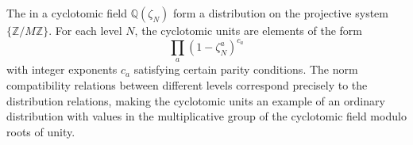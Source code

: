The  in a cyclotomic field $\mathbb{Q}(\zeta_N)$ form a distribution on the projective system $\{\mathbb{Z}/M\mathbb{Z}\}$. For each level $N$, the cyclotomic units are elements of the form
$$
\prod_{a} (1 - \zeta_N^a)^{c_a}
$$
with integer exponents $c_a$ satisfying certain parity conditions. The norm compatibility relations between different levels correspond precisely to the distribution relations, making the cyclotomic units an example of an ordinary distribution with values in the multiplicative group of the cyclotomic field modulo roots of unity.

